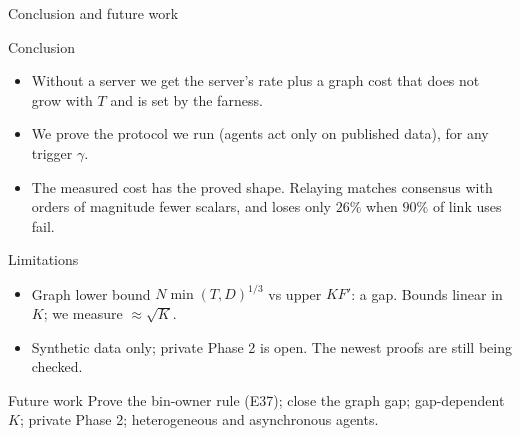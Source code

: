 \documentclass[11pt]{beamer}
\begin{document}
\begin{frame}{Conclusion and future work}
\scriptsize
\setlength{\itemsep}{0pt}
\begin{block}{Conclusion}
\begin{itemize}
\item Without a server we get the server's rate plus a graph cost that does not grow with $T$ and is set by the farness.
\item We prove the protocol we run (agents act only on published data), for any trigger $\gamma$.
\item The measured cost has the proved shape. Relaying matches consensus with orders of magnitude fewer scalars, and loses only $26\%$ when $90\%$ of link uses fail.
\end{itemize}
\end{block}
\begin{alertblock}{Limitations}
\begin{itemize}
\item Graph lower bound $N\min(T,D)^{1/3}$ vs upper $KF'$: a gap. Bounds linear in $K$; we measure $\approx\sqrt K$.
\item Synthetic data only; private Phase 2 is open. The newest proofs are still being checked.
\end{itemize}
\end{alertblock}
\begin{block}{Future work}
Prove the bin-owner rule (E37); close the graph gap; gap-dependent $K$; private Phase 2; heterogeneous and asynchronous agents.
\end{block}
\end{frame}
\end{document}
